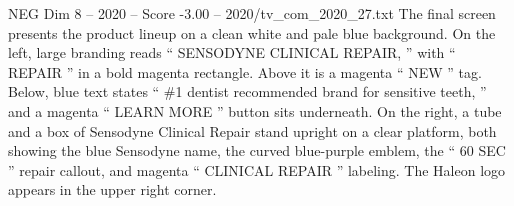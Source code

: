 \begin{textsample}{NEG Dim 8 – 2020 – Score -3.00 – 2020/tv\_com\_2020\_27.txt}
The final screen presents the product lineup on a clean white and pale blue background.
On the left, large branding reads “ SENSODYNE CLINICAL REPAIR, ” with “ REPAIR ” in a bold magenta rectangle.
Above it is a magenta “ NEW ” tag.
Below, blue text states “ \#1 dentist recommended brand for sensitive teeth, ” and a magenta “ LEARN MORE ” button sits underneath.
On the right, a tube and a box of Sensodyne Clinical Repair stand upright on a clear platform, both showing the blue Sensodyne name, the curved blue-purple emblem, the “ 60 SEC ” repair callout, and magenta “ CLINICAL REPAIR ” labeling.
The Haleon logo appears in the upper right corner.

\end{textsample}

